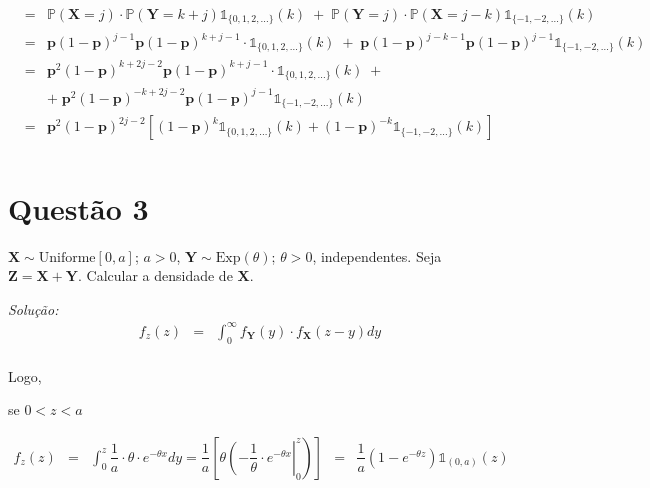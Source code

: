\documentclass[a4paper, 11pt]{article}
\begin{document}
\begin{equation*}
\begin{array}{lclll}
& = & \mathds{P}(\mathbf{X} = j) \cdot \mathds{P}(\mathbf{Y} = k + j)\mathds{1}_{\{0,1,2,\ldots\}}(k) \; + \; \mathds{P}(\mathbf{Y} = j)\cdot \mathds{P}(\mathbf{X} = j - k)\mathds{1}_{\{-1,-2,\ldots\}}(k)  \\
& = & \mathbf{p}(1-\mathbf{p})^{j-1}\mathbf{p}(1-\mathbf{p})^{k+j-1} \cdot \mathds{1}_{\{0,1,2,\ldots\}}(k) \; + \; \mathbf{p}(1-\mathbf{p})^{j-k-1}\mathbf{p}(1-\mathbf{p})^{j-1} \mathds{1}_{\{-1,-2,\ldots\}}(k)  \\

& = & \mathbf{p}^{2}(1-\mathbf{p})^{k+2j-2}\mathbf{p}(1-\mathbf{p})^{k+j-1} \cdot \mathds{1}_{\{0,1,2,\ldots\}}(k) \; +  \\
&  & + \; \mathbf{p}^{2}(1-\mathbf{p})^{-k+2j-2}\mathbf{p}(1-\mathbf{p})^{j-1} \mathds{1}_{\{-1,-2,\ldots\}}(k)  \\

& = & \mathbf{p}^{2}(1-\mathbf{p})^{2j-2}\left[(1-\mathbf{p})^{k}\mathds{1}_{\{0,1,2,\ldots\}}(k) + (1-\mathbf{p})^{-k} \mathds{1}_{\{-1,-2,\ldots\}}(k)\right]  \\

\end{array}
\end{equation*}


\section*{Questão 3} 

$\mathbf{X} \sim \mbox{Uniforme}[0,a]$; $a>0$, $\mathbf{Y} \sim \mbox{Exp}(\theta)$; $\theta>0$, independentes. Seja $\mathbf{Z} = \mathbf{X} + \mathbf{Y}$. Calcular a densidade de $\mathbf{X}$.

\noindent
\textit{Solução:} \\
\begin{equation*}
\begin{array}{lclll}
f_{z}(z) & = & \displaystyle\int_{0}^{\infty} f_{\mathbf{Y}}(y) \cdot f_{\mathbf{X}}(z-y)dy  \\
\end{array}
\end{equation*}

Logo, 

\hspace{1cm} se $0<z<a$

\begin{equation*}
\begin{array}{lclll}
f_{z}(z) & = & \left.\displaystyle\int_{0}^{z} \dfrac{1}{a} \cdot \theta \cdot e^{-\theta x} dy = \dfrac{1}{a}\left[ \theta \left( -\dfrac{1}{\theta} \cdot e^{-\theta x} \right\vert_{0}^{z}\right) \right] & = & \dfrac{1}{a} \left( 1 - e^{-\theta z} \right) \mathds{1}_{(0,a)}(z) \\
\end{array}
\end{equation*}
\end{document}
